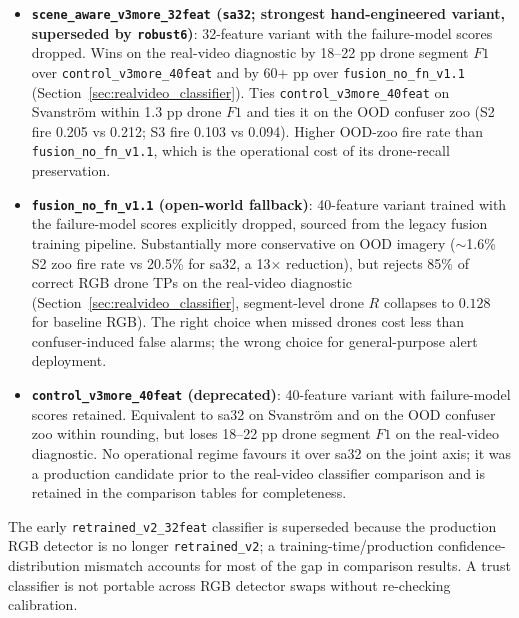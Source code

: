 \begin{itemize}
    \item \textbf{\texttt{scene\_aware\_v3more\_32feat} (\texttt{sa32}; strongest hand-engineered variant, superseded by \texttt{robust6})}: 32-feature variant with the failure-model scores dropped. Wins on the real-video diagnostic by 18--22 pp drone segment $F1$ over \texttt{control\_v3more\_40feat} and by 60+ pp over \texttt{fusion\_no\_fn\_v1.1} (Section~\ref{sec:realvideo_classifier}). Ties \texttt{control\_v3more\_40feat} on Svanstr\"om within 1.3 pp drone $F1$ and ties it on the OOD confuser zoo (S2 fire 0.205 vs 0.212; S3 fire 0.103 vs 0.094). Higher OOD-zoo fire rate than \texttt{fusion\_no\_fn\_v1.1}, which is the operational cost of its drone-recall preservation.
    \item \textbf{\texttt{fusion\_no\_fn\_v1.1} (open-world fallback)}: 40-feature variant trained with the failure-model scores explicitly dropped, sourced from the legacy fusion training pipeline. Substantially more conservative on OOD imagery ($\sim$1.6\% S2 zoo fire rate vs 20.5\% for sa32, a 13$\times$ reduction), but rejects 85\% of correct RGB drone TPs on the real-video diagnostic (Section~\ref{sec:realvideo_classifier}, segment-level drone $R$ collapses to $0.128$ for baseline RGB). The right choice when missed drones cost less than confuser-induced false alarms; the wrong choice for general-purpose alert deployment.
    \item \textbf{\texttt{control\_v3more\_40feat} (deprecated)}: 40-feature variant with failure-model scores retained. Equivalent to sa32 on Svanstr\"om and on the OOD confuser zoo within rounding, but loses 18--22 pp drone segment $F1$ on the real-video diagnostic. No operational regime favours it over sa32 on the joint axis; it was a production candidate prior to the real-video classifier comparison and is retained in the comparison tables for completeness.
\end{itemize}

The early \texttt{retrained\_v2\_32feat} classifier is superseded because the production RGB detector is no longer \texttt{retrained\_v2}; a training-time/production confidence-distribution mismatch accounts for most of the gap in comparison results. A trust classifier is not portable across RGB detector swaps without re-checking calibration.

